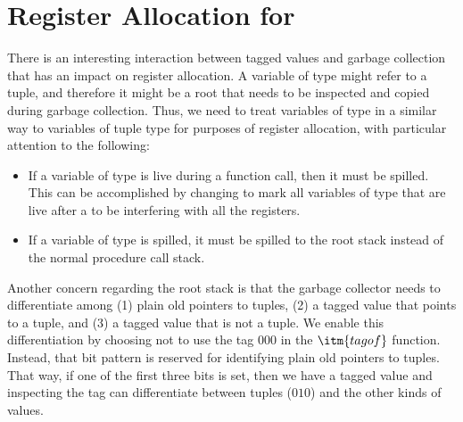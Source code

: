 \documentclass[7x10]{TimesAPriori_MIT}%
\def\racketEd{0}
\def\pythonEd{1}
\providecommand{\BookEdition}{1}
\let\edition\BookEdition
\newcommand{\racket}[1]{{\if\edition\racketEd{#1}\fi}}
\newcommand{\pythonColor}[0]{}
\newcommand{\python}[1]{{\if\edition\pythonEd\pythonColor #1\fi}}
\newtheorem{exercise}[theorem]{Exercise}
\numberwithin{theorem}{chapter}
\numberwithin{definition}{chapter}
\numberwithin{equation}{chapter}
\begin{document}



\section{Register Allocation for \LangAny{} }
\label{sec:register-allocation-Lany}

There is an interesting interaction between tagged values and garbage
collection that has an impact on register allocation.  A variable of
type \ANYTY{} might refer to a tuple, and therefore it might be a root
that needs to be inspected and copied during garbage collection. Thus,
we need to treat variables of type \ANYTY{} in a similar way to
variables of tuple type for purposes of register allocation,
with particular attention to the following:
\begin{itemize}
\item If a variable of type \ANYTY{} is live during a function call,
  then it must be spilled. This can be accomplished by changing
   to mark all variables of type \ANYTY{}
  that are live after a  to be interfering with all the
  registers.

\item If a variable of type \ANYTY{} is spilled, it must be spilled to
  the root stack instead of the normal procedure call stack.
\end{itemize}

Another concern regarding the root stack is that the garbage collector
needs to differentiate among (1) plain old pointers to tuples, (2) a
tagged value that points to a tuple, and (3) a tagged value that is
not a tuple. We enable this differentiation by choosing not to use the
tag $000$ in the $\itm{tagof}$ function. Instead, that bit pattern is
reserved for identifying plain old pointers to tuples. That way, if
one of the first three bits is set, then we have a tagged value and
inspecting the tag can differentiate between tuples ($010$) and the
other kinds of values.

\end{document}
